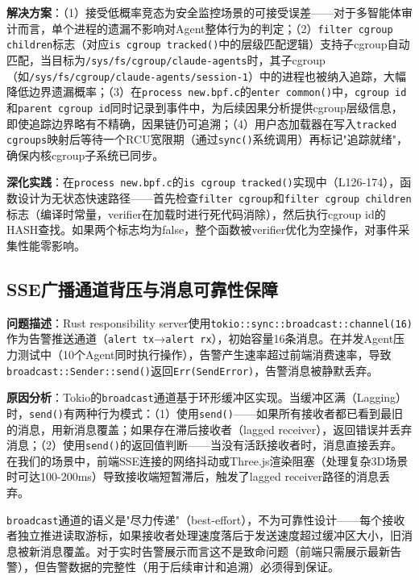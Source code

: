\documentclass[a4paper]{ctexart}
\makeatletter
\renewcommand{\_}{%
  \ifmmode
    \nfss@text{\textunderscore}%
  \else
    \textunderscore\discretionary{}{}{}%
  \fi}
\makeatother
\begin{document}
\textbf{解决方案}：（1）接受低概率竞态为安全监控场景的可接受误差——对于多智能体审计而言，单个进程的遗漏不影响对Agent整体行为的判定；（2）\texttt{filter\_cgroup\_children}标志（对应\texttt{is\_cgroup\_tracked()}中的层级匹配逻辑）支持子cgroup自动匹配，当目标为\texttt{/sys/fs/cgroup/\allowbreak claude-agents}时，其子cgroup（如\texttt{/sys/fs/cgroup/\allowbreak claude-agents/\allowbreak session-1}）中的进程也被纳入追踪，大幅降低边界遗漏概率；（3）在\texttt{process\_new.bpf.c}的\texttt{enter\_common()}中，\texttt{cgroup\_id}和\texttt{parent\_cgroup\_id}同时记录到事件中，为后续因果分析提供cgroup层级信息，即使追踪边界略有不精确，因果链仍可追溯；（4）用户态加载器在写入\texttt{tracked\_cgroups}映射后等待一个RCU宽限期（通过\texttt{sync()}系统调用）再标记"追踪就绪"，确保内核cgroup子系统已同步。


\textbf{深化实践}：在\texttt{process\_new.bpf.c}的\texttt{is\_cgroup\_tracked()}实现中（L126-174），函数设计为无状态快速路径——首先检查\texttt{filter\_cgroup}和\texttt{filter\_cgroup\_children}标志（编译时常量，verifier在加载时进行死代码消除），然后执行cgroup\_id的HASH查找。如果两个标志均为false，整个函数被verifier优化为空操作，对事件采集性能零影响。


\subsection{SSE广播通道背压与消息可靠性保障}



\textbf{问题描述}：Rust responsibility server使用\texttt{tokio::sync::broadcast::channel(16)}作为告警推送通道（\texttt{alert\_tx}→\texttt{alert\_rx}），初始容量16条消息。在并发Agent压力测试中（10个Agent同时执行操作），告警产生速率超过前端消费速率，导致\texttt{broadcast::Sender::send()}返回\texttt{Err(SendError)}，告警消息被静默丢弃。\sloppy


\textbf{原因分析}：Tokio的\texttt{broadcast}通道基于环形缓冲区实现。当缓冲区满（Lagging）时，\texttt{send()}有两种行为模式：（1）使用\texttt{send()}——如果所有接收者都已看到最旧的消息，用新消息覆盖；如果存在滞后接收者（lagged receiver），返回错误并丢弃消息；（2）使用\texttt{send()}的返回值判断——当没有活跃接收者时，消息直接丢弃。在我们的场景中，前端SSE连接的网络抖动或Three.js渲染阻塞（处理复杂3D场景时可达100-200ms）导致接收端短暂滞后，触发了lagged receiver路径的消息丢弃。


\texttt{broadcast}通道的语义是"尽力传递"（best-effort），不为可靠性设计——每个接收者独立推进读取游标，如果接收者处理速度落后于发送速度超过缓冲区大小，旧消息被新消息覆盖。对于实时告警展示而言这不是致命问题（前端只需展示最新告警），但告警数据的完整性（用于后续审计和追溯）必须得到保证。
\end{document}
